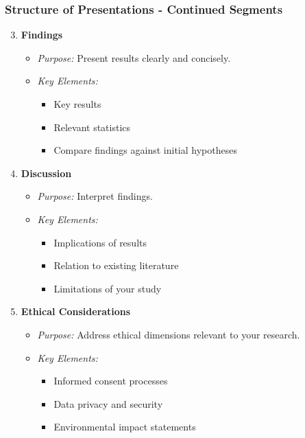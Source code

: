 \documentclass[aspectratio=169]{beamer}
\begin{document}
\begin{frame}[fragile]
    \frametitle{Structure of Presentations - Continued Segments}
    \begin{enumerate}
        \setcounter{enumi}{2}
        \item \textbf{Findings}
            \begin{itemize}
                \item \textit{Purpose:} Present results clearly and concisely.
                \item \textit{Key Elements:}
                    \begin{itemize}
                        \item Key results
                        \item Relevant statistics
                        \item Compare findings against initial hypotheses
                    \end{itemize}
            \end{itemize}

        \item \textbf{Discussion}
            \begin{itemize}
                \item \textit{Purpose:} Interpret findings.
                \item \textit{Key Elements:}
                    \begin{itemize}
                        \item Implications of results
                        \item Relation to existing literature
                        \item Limitations of your study
                    \end{itemize}
            \end{itemize}

        \item \textbf{Ethical Considerations}
            \begin{itemize}
                \item \textit{Purpose:} Address ethical dimensions relevant to your research.
                \item \textit{Key Elements:}
                    \begin{itemize}
                        \item Informed consent processes
                        \item Data privacy and security
                        \item Environmental impact statements
                    \end{itemize}
            \end{itemize}


\end{enumerate}
\end{frame}
\end{document}
